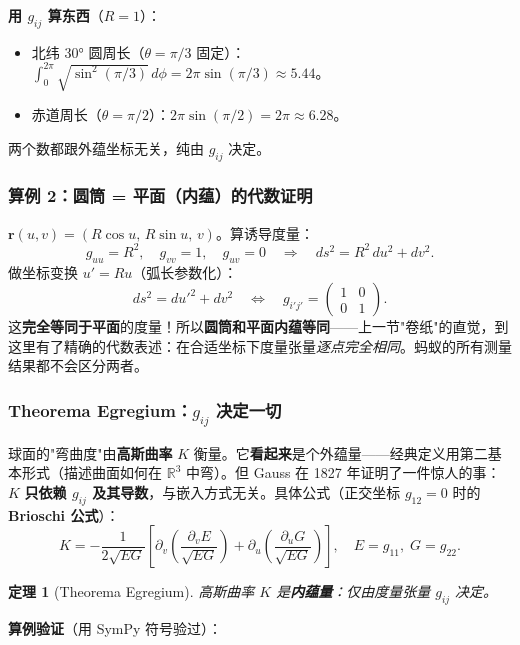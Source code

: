 \documentclass[11pt,a4paper]{article}
\theoremstyle{mythm}
\newtheorem{theorem}{定理}[section]
\theoremstyle{mydef}
\newcommand{\R}{\mathbb{R}}
\begin{document}
\textbf{用 $g_{ij}$ 算东西}（$R=1$）：
\begin{itemize}[leftmargin=2em]
\item 北纬 $30°$ 圆周长（$\theta = \pi/3$ 固定）：$\int_0^{2\pi}\sqrt{\sin^2(\pi/3)}\,d\phi = 2\pi\sin(\pi/3) \approx 5.44$。
\item 赤道周长（$\theta = \pi/2$）：$2\pi\sin(\pi/2) = 2\pi \approx 6.28$。
\end{itemize}
两个数都跟外蕴坐标无关，纯由 $g_{ij}$ 决定。

\subsubsection*{算例 2：圆筒 = 平面（内蕴）的代数证明}
$\mathbf{r}(u, v) = (R\cos u,\, R\sin u,\, v)$。算诱导度量：
$$g_{uu} = R^2,\quad g_{vv} = 1,\quad g_{uv} = 0\quad\Longrightarrow\quad ds^2 = R^2\,du^2 + dv^2.$$
做坐标变换 $u' = R u$（弧长参数化）：
$$ds^2 = du'^2 + dv^2 \quad\Longleftrightarrow\quad g_{i'j'} = \begin{pmatrix}1 & 0\\ 0 & 1\end{pmatrix}.$$
这\textbf{完全等同于平面}的度量！所以\textbf{圆筒和平面内蕴等同}——上一节"卷纸"的直觉，到这里有了精确的代数表述：在合适坐标下度量张量\emph{逐点完全相同}。蚂蚁的所有测量结果都不会区分两者。

\subsubsection*{Theorema Egregium：$g_{ij}$ 决定一切}

球面的"弯曲度"由\textbf{高斯曲率} $K$ 衡量。它\textbf{看起来}是个外蕴量——经典定义用第二基本形式（描述曲面如何在 $\R^3$ 中弯）。但 Gauss 在 1827 年证明了一件惊人的事：$K$ \textbf{只依赖 $g_{ij}$ 及其导数}，与嵌入方式无关。具体公式（正交坐标 $g_{12} = 0$ 时的 \textbf{Brioschi 公式}）：
\begin{equation}\label{eq:brioschi}
K = -\frac{1}{2\sqrt{EG}}\!\left[\partial_v\!\left(\frac{\partial_v E}{\sqrt{EG}}\right) + \partial_u\!\left(\frac{\partial_u G}{\sqrt{EG}}\right)\right],\quad E = g_{11},\;G = g_{22}.
\end{equation}

\begin{theorem}[Theorema Egregium]
高斯曲率 $K$ 是\textbf{内蕴量}：仅由度量张量 $g_{ij}$ 决定。
\end{theorem}

\textbf{算例验证}（用 SymPy 符号验过）：
\end{document}
